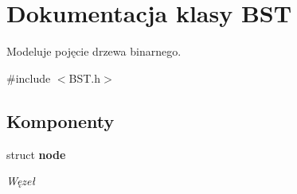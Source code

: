 \hypertarget{class_b_s_t}{\section{\-Dokumentacja klasy \-B\-S\-T}
\label{class_b_s_t}
}


\-Modeluje pojęcie drzewa binarnego.  




{\ttfamily \#include $<$\-B\-S\-T.\-h$>$}

\subsection*{\-Komponenty}
\begin{DoxyCompactItemize}
\item 
struct {\bfseries node}
\begin{DoxyCompactList}\small\item\em \-Węzeł \end{DoxyCompactList}\end{DoxyCompactItemize}
